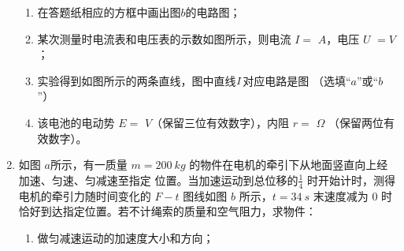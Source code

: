\begin{enumerate}
\begin{enumerate}
\item
在答题纸相应的方框中画出图$ b $的电路图；

\item 
某次测量时电流表和电压表的示数如图所示，则电流 $ I= $ \underlinegap $A $，电压 $ U $
\underlinegap 
$ = V $；
\begin{figure}[h!]
\centering

\hfil
 
\end{figure}





\item 
实验得到如图所示的两条直线，图中直线$ \lmd{1} $对应电路是图 \underlinegap （选填“$ a $”或“$ b $”）
\begin{figure}[h!]
\centering

\end{figure}




\item 
该电池的电动势 $ E=$ \underlinegap $V $（保留三位有效数字），内阻 $ r= $ \underlinegap $ \Omega $ （保留两位有效数字）。

\end{enumerate}





\newpage
\item
如图 $ a $所示，有一质量 $ m=200 \ kg $ 的物件在电机的牵引下从地面竖直向上经加速、匀速、匀减速至指定
位置。当加速运动到总位移的$ \frac{ 1 }{ 4 } $
时开始计时，测得电机的牵引力随时间变化的 $ F-t $ 图线如图 $ b $ 所示，$ t=34 \ s $
末速度减为 $ 0 $ 时恰好到达指定位置。若不计绳索的质量和空气阻力，求物件：
\begin{enumerate}
\item
做匀减速运动的加速度大小和方向；




\end{enumerate}
\end{enumerate}
